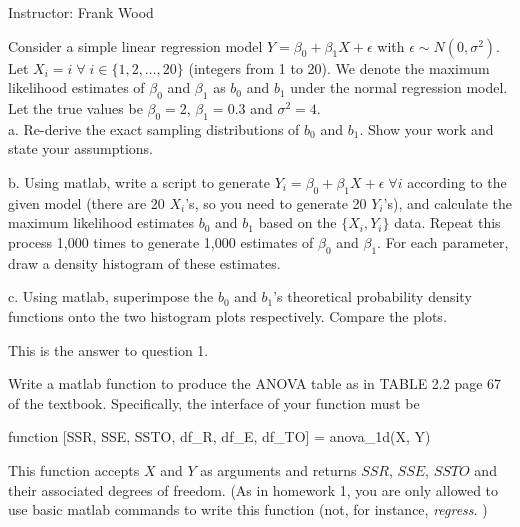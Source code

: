 \documentclass[12pt]{article}
\begin{document}
 \begin{center}
  Instructor: Frank Wood
 \end{center}
{}
\finishfirstpage



 {
  Consider a simple linear regression model $Y=\beta_0+\beta_1X+\epsilon$ with $\epsilon \sim N(0,\sigma^2)$.  Let $X_i = i \;  \forall \; i \in \{1, 2, \ldots, 20\}$ (integers from 1 to 20). We denote the maximum likelihood estimates of $\beta_0$ and $\beta_1$ as $b_0$ and $b_1$ under the normal regression model. Let the true values be $\beta_0=2$, $\beta_1=0.3$ and $\sigma^2=4$.\\

 a. Re-derive the exact sampling distributions of $b_0$ and $b_1$.  Show your work and state your assumptions.

 b. Using matlab, write a script to generate $Y_i = \beta_0+\beta_1X+\epsilon \; \forall i$ according to the given model (there are 20 $X_i$'s, so you need to generate 20 $Y_i$'s), and calculate the maximum likelihood estimates $b_0$ and $b_1$ based on the $\{X_i, Y_i\}$ data. Repeat this process 1,000 times to generate 1,000 estimates of $\beta_0$ and $\beta_1$. For each parameter, draw a density histogram of these estimates.

 c. Using matlab, superimpose the $b_0$ and $b_1$'s theoretical probability density functions onto the two histogram plots respectively. Compare the plots.  
   }
 { \vfill
  \answer 
} {This is the answer to question 1. }

 {
Write a matlab function to produce the ANOVA table as in TABLE 2.2 page 67 of the textbook. Specifically, the interface of your function must be

\begin{center}                function [SSR, SSE, SSTO, df\_R, df\_E, df\_TO] = anova\_1d(X, Y)
\end{center}

This function accepts $X$ and $Y$ as arguments and returns $SSR$, $SSE$, $SSTO$ and their associated degrees of freedom. (As in homework 1, you are only allowed to use basic matlab commands to write this function (not, for instance, {\em regress}. )

  }
 { \vfill
  \answer
} { }
\end{document}
